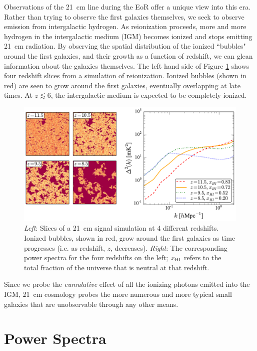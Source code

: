 Observations of the 21\ cm line during the EoR offer a unique view into this era.
Rather than trying to observe the first galaxies themselves, we seek to observe emission
from intergalactic hydrogen.  As reionization proceeds, more and more hydrogen in the
intergalactic medium (IGM) becomes ionized and stops emitting 21\ cm radiation.
By observing the spatial distribution of the ionized ``bubbles" around the first galaxies,
and their growth as a function of redshift, we can glean information about the galaxies themselves.
The left hand side of Figure \ref{fig:cubes_and_pspecs} shows four redshift slices from a simulation of reionization.
Ionized bubbles (shown in red) are seen to grow around the first galaxies, eventually overlapping at late times.
At $z \lesssim 6$, the intergalactic medium is expected to be completely ionized.
\begin{figure}[htbp!]
\centering
\includegraphics[width=4.5in]{figures/cubesAndPspecs.pdf}
\caption{\emph{Left}: Slices of a 21\ cm signal simulation at 4 different redshifts.  Ionized bubbles, shown in red, grow around the first galaxies as time progresses (i.e. as redshift, $z$, decreases).  \emph{Right}: The corresponding power spectra for the four redshifts on the left; $x_{\rm HI}$ refers to the total fraction of the universe that is neutral at that redshift.}
\label{fig:cubes_and_pspecs}
\end{figure}
Since we probe the \emph{cumulative} effect of all the ionizing photons emitted into the IGM,
21\ cm cosmology probes the more numerous and more typical small galaxies that are unobservable through
any other means.

\section{Power Spectra}

